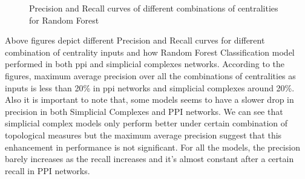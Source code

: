 \documentclass[9pt]{article}
\begin{document}
\begin{figure}[!htb]
\endminipage
\caption{Precision and Recall curves of different combinations of centralities for Random Forest}
\end{figure}

Above figures depict different Precision and Recall curves for different combination of centrality inputs and how Random Forest Classification model performed in both ppi and simplicial complexes networks. According to the figures, maximum average precision over all the combinations of centralities as inputs is less than 20\% in ppi networks and simplicial complexes around 20\%. Also it is important to note that, some models seems to have a slower drop in precision in both Simplicial Complexes and PPI networks. We can see that simplicial complex models only perform better under certain combination of topological measures but the maximum average precision suggest that this enhancement in performance is not significant. For all the models, the precision barely increases as the recall increases and it’s almost constant after a certain recall in PPI networks.
\end{document}
